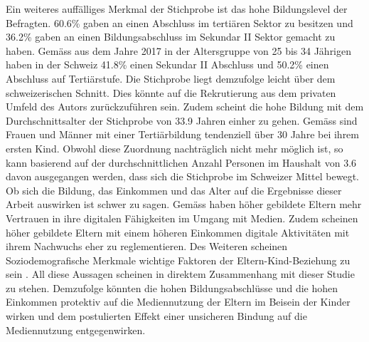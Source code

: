 Ein weiteres auffälliges Merkmal der Stichprobe ist das hohe Bildungslevel der Befragten. 60.6\% gaben an einen Abschluss im tertiären Sektor zu besitzen und 36.2\% gaben an einen Bildungsabschluss im Sekundar II Sektor gemacht zu haben. Gemäss  aus dem Jahre 2017 in der Altersgruppe von 25 bis 34 Jährigen haben in der Schweiz 41.8\% einen Sekundar II Abschluss und 50.2\% einen Abschluss auf Tertiärstufe. Die Stichprobe liegt demzufolge leicht über dem schweizerischen Schnitt. Dies könnte auf die Rekrutierung aus dem privaten Umfeld des Autors zurückzuführen sein. Zudem scheint die hohe Bildung mit dem Durchschnittsalter der Stichprobe von 33.9 Jahren einher zu gehen. Gemäss  sind  Frauen und Männer mit einer Tertiärbildung tendenziell über 30 Jahre bei ihrem ersten Kind. Obwohl diese Zuordnung nachträglich nicht mehr möglich ist, so kann basierend auf der durchschnittlichen Anzahl Personen im Haushalt von 3.6 davon ausgegangen werden, dass sich die Stichprobe im Schweizer Mittel bewegt. Ob sich die Bildung, das Einkommen und das Alter auf die Ergebnisse dieser Arbeit auswirken ist schwer zu sagen. Gemäss  haben höher gebildete Eltern mehr Vertrauen in ihre digitalen Fähigkeiten im Umgang mit Medien. Zudem scheinen höher gebildete Eltern mit einem höheren Einkommen digitale Aktivitäten mit ihrem Nachwuchs eher zu reglementieren. Des Weiteren scheinen Soziodemografische Merkmale wichtige Faktoren der Eltern-Kind-Beziehung zu sein \cite{Kammerl2012}. All diese Aussagen scheinen in direktem Zusammenhang mit dieser Studie zu stehen. Demzufolge könnten die hohen Bildungsabschlüsse und die hohen Einkommen protektiv auf die Mediennutzung der Eltern im Beisein der Kinder wirken und dem postulierten Effekt einer unsicheren Bindung auf die Mediennutzung entgegenwirken. 

